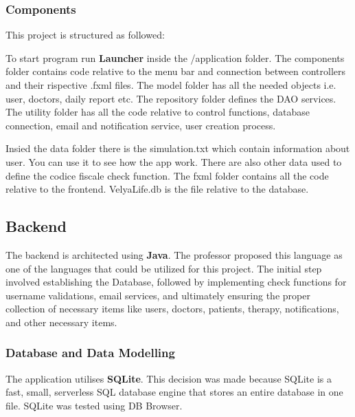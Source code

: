 \documentclass[10pt, titlepage]{article}
\begin{document}
    \subsubsection{Components}
    This project is structured as followed:

    To start program run \textbf{Launcher} inside the /application folder. The components folder contains code relative to the menu bar and connection between controllers and their rispective .fxml files. The model folder has all the needed objects i.e. user, doctors, daily report etc. The repository folder defines the DAO services. The utility folder has all the code relative to control functions, database connection, email and notification service, user creation process.

    Insied the data folder there is the simulation.txt which contain information about user. You can use it to see how the app work. There are also other data used to define the codice fiscale check function. The fxml folder contains all the code relative to the frontend. VelyaLife.db is the file relative to the database.
    
    \subsection{Backend}
    The backend is architected using \textbf{Java}. The professor proposed this language as one of the languages that could be utilized for this project. The initial step involved establishing the Database, followed by implementing check functions for username validations, email services, and ultimately ensuring the proper collection of necessary items like users, doctors, patients, therapy, notifications, and other necessary items.

    \subsubsection{Database and Data Modelling}
    The application utilises \textbf{SQLite}. This decision was made because SQLite is a fast, small, serverless SQL database engine that stores an entire database in one file. SQLite was tested using DB Browser.
    
\end{document}
